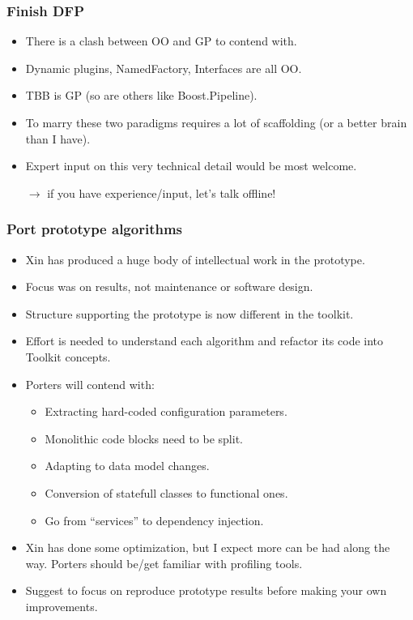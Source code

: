 \documentclass[xcolor=dvipsnames]{beamer}
\begin{document}
\begin{frame}
  \frametitle{Finish DFP}
  \begin{itemize}
  \item There is a clash between OO and GP to contend with.
  \item Dynamic plugins, NamedFactory, Interfaces are all OO.
  \item TBB is GP (so are others like Boost.Pipeline).
  \item To marry these two paradigms requires a lot of scaffolding (or a better brain than I have).
  \item Expert input on this very technical detail would be most welcome.
  \item[$\rightarrow$] if you have experience/input, let's talk offline!
  \end{itemize}
\end{frame}

\begin{frame}
  \frametitle{Port prototype algorithms}

  \begin{itemize}\small
  \item Xin has produced a huge body of intellectual work in the prototype.
  \item Focus was on results, not maintenance or software design.
  \item Structure supporting the prototype is now different in the toolkit.
  \item Effort is needed to understand each algorithm and refactor its code into Toolkit concepts.
  \item Porters will contend with:
    \begin{itemize}
    \item Extracting hard-coded configuration parameters.
    \item Monolithic code blocks need to be split.
    \item Adapting to data model changes.
    \item Conversion of statefull classes to functional ones.
    \item Go from ``services'' to dependency injection.
    \end{itemize}
  \item Xin has done some optimization, but I expect more can be had
    along the way.  Porters should be/get familiar with profiling
    tools.
  \item Suggest to focus on reproduce prototype results before making your own improvements.
  \end{itemize}
\end{frame}
\end{document}
